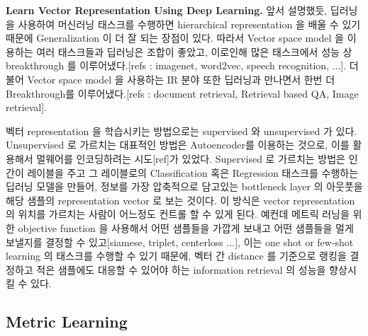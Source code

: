 




\textbf{Learn Vector Representation Using Deep Learning.} 앞서 설명했듯, 딥러닝을 사용하여 머신러닝 태스크를 수행하면 hierarchical representation 을 배울 수 있기 때문에 Generalization 이 더 잘 되는 장점이 있다. 따라서 Vector space model 을 이용하는 여러 태스크들과 딥러닝은 조합이 좋았고, 이로인해 많은 태스크에서 성능 상 breakthrough 를 이루어냈다.[refs : imagenet, word2vec, speech recognition, ...]. 더불어 Vector space model 을 사용하는 IR 분야 또한 딥러닝과 만나면서 한번 더 Breakthrough를 이루어냈다.[refs : document retrieval, Retrieval based QA, Image retrieval]. 

벡터 representation 을 학습시키는 방법으로는 supervised 와 unsupervised 가 있다. Unsupervised 로 가르치는 대표적인 방법은 Autoencoder를 이용하는 것으로, 이를 활용해서 멀웨어를 인코딩하려는 시도[ref]가 있었다. Supervised 로 가르치는 방법은 인간이 레이블을 주고 그 레이블로의 Classification 혹은 Regression 태스크를 수행하는 딥러닝 모델을 만들어, 정보를 가장 압축적으로 담고있는 bottleneck layer 의 아웃풋을 해당 샘플의 representation vector 로 보는 것이다. 이 방식은 vector representation 의 위치를 가르치는 사람이 어느정도 컨트롤 할 수 있게 된다. 예컨데 메트릭 러닝을 위한 objective function 을 사용해서 어떤 샘플들을 가깝게 보내고 어떤 샘플들을 멀게 보낼지를 결정할 수 있고[siamese, triplet, centerloss ...], 이는 one shot or few-shot learning 의 태스크를 수행할 수 있기 때문에, 벡터 간 distance 를 기준으로 랭킹을 결정하고 적은 샘플에도 대응할 수 있어야 하는 information retrieval 의 성능을 향상시킬 수 있다. 


\subsection{Metric Learning}


